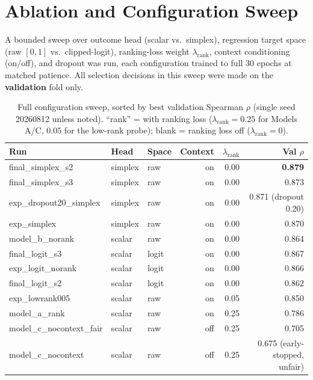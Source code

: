 \documentclass[11pt]{article}
\begin{document}
\section{Ablation and Configuration Sweep}
\label{sec:sweep}

A bounded sweep over outcome head (scalar vs.\ simplex), regression target
space (raw $[0,1]$ vs.\ clipped-logit), ranking-loss weight $\lambda_{\text{rank}}$,
context conditioning (on/off), and dropout was run, each configuration trained
to full 30 epochs at matched patience. All selection decisions in this sweep
were made on the \textbf{validation} fold only.

\begin{table}[H]
\centering
\caption{Full configuration sweep, sorted by best validation Spearman $\rho$
(single seed 20260812 unless noted). ``rank'' = with ranking loss
($\lambda_{\text{rank}}{=}0.25$ for Models A/C, $0.05$ for the low-rank probe);
blank = ranking loss off ($\lambda_{\text{rank}}{=}0$).}
\label{tab:sweep}
\begin{tabular}{lllrrr}
\toprule
Run & Head & Space & Context & $\lambda_{\text{rank}}$ & Val $\rho$ \\
\midrule
final\_simplex\_s2      & simplex & raw    & on  & 0.00 & \textbf{0.879} \\
final\_simplex\_s3      & simplex & raw    & on  & 0.00 & 0.873 \\
exp\_dropout20\_simplex & simplex & raw    & on  & 0.00 & 0.871 (dropout 0.20) \\
exp\_simplex            & simplex & raw    & on  & 0.00 & 0.870 \\
model\_b\_norank        & scalar  & raw    & on  & 0.00 & 0.864 \\
final\_logit\_s3        & scalar  & logit  & on  & 0.00 & 0.867 \\
exp\_logit\_norank      & scalar  & logit  & on  & 0.00 & 0.866 \\
final\_logit\_s2        & scalar  & logit  & on  & 0.00 & 0.862 \\
exp\_lowrank005         & scalar  & raw    & on  & 0.05 & 0.850 \\
model\_a\_rank          & scalar  & raw    & on  & 0.25 & 0.786 \\
model\_c\_nocontext\_fair & scalar & raw  & off & 0.25 & 0.705 \\
model\_c\_nocontext     & scalar  & raw    & off & 0.25 & 0.675 (early-stopped, unfair) \\
\bottomrule
\end{tabular}
\end{table}
\end{document}
